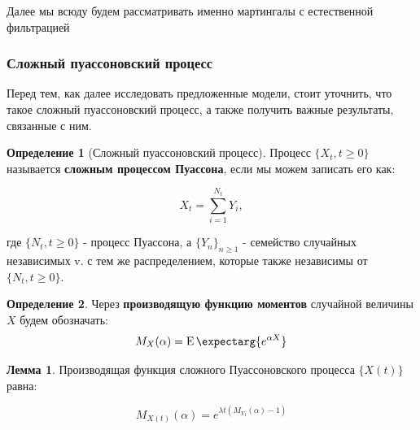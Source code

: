 \documentclass[a4paper,12pt]{article}
\theoremstyle{definition}
\newtheorem{definition}{Определение}[section]
\newtheorem{lemma}{Лемма}
\newcommand{\expect}{\operatorname{E}\expectarg}
\begin{document}
Далее мы всюду будем рассматривать именно мартингалы с естественной фильтрацией 

\subsubsection{Сложный пуассоновский процесс}\label{sec:compound_poisson}

Перед тем, как далее исследовать предложенные модели, стоит уточнить, что такое сложный пуассоновский процесс, а также получить важные результаты, связанные с ним.

\begin{definition}[Сложный пуассоновский процесс]
    \label{def:compound_poisson}
    Процесс $\{X_t, t \ge 0\}$ называется \textbf{сложным процессом Пуассона}, если мы можем записать его как:
    
    \begin{equation}
        X_t = \sum_{i=1}^{N_t} Y_i,
    \end{equation}
    
    где $\{N_t, t \ge 0\}$ - процесс Пуассона, а $\{Y_n\}_{n \ge 1}$ - семейство случайных независимых v. с тем же распределением, которые также независимы от $\{N_t, t \ge 0\}$.
\end{definition}

\begin{definition}\label{def:moment_generating_function}
Через \textbf{производящую функцию моментов} случайной величины $X$ будем обозначать:
    \begin{equation*}
        M_X(\alpha) = \expect{e^{\alpha X}}
    \end{equation*}
\end{definition}

\begin{lemma}\label{thm:thm2_moment_generating_function}
Производящая функция сложного Пуассоновского процесса $\{X(t)\}$ равна:

\begin{equation}\label{eq:moment_generating_for_poisson}
     M_{X(t)}(\alpha) = e^{\lambda t \left(M_{Y_1}(\alpha) - 1\right)}
\end{equation}

\end{lemma}
\end{document}
